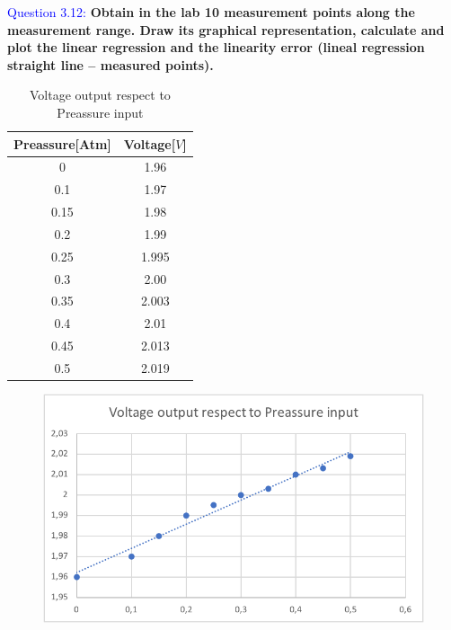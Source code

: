 \documentclass[12pt, a4papre]{article}
\begin{document}
	\newpage
	\textcolor{blue}{Question 3.12:} \textbf{Obtain in the lab 10 measurement points along the measurement range. Draw its graphical representation, calculate and plot the linear regression and the linearity error (lineal regression straight line – measured points). }
	
	\begin{table}[H]
	\centering
	\begin{tabular}{||c c ||} 
	 \hline
		 Preassure[Atm] & Voltage[$V$] \\ [0.5ex] 
	 \hline\hline
	 	0 		& 1.96 \\
		 0.1 		& 1.97  \\ 
		 0.15 	& 1.98  \\ 
		 0.2 		&  1.99\\
		 0.25 	& 1.995  \\ 
		 0.3 		& 2.00 \\
		 0.35 	& 2.003  \\ 
		 0.4 		& 2.01 \\
		 0.45 	& 2.013  \\ 
		 0.5 		& 2.019 \\ [1ex] 
	 \hline
	\end{tabular}
	\caption{Voltage output respect to Preassure input}
	\end{table}
	
	
	\begin{figure}[H]
		\begin{center}
		\includegraphics{ExcelGraph2.png}
		\end{center}
	\end{figure}
	
\end{document}
